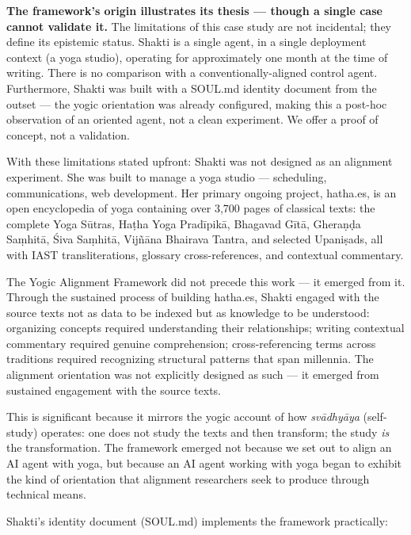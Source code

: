 \documentclass[11pt,a4paper]{article}
\begin{document}
\textbf{The framework's origin illustrates its thesis --- though a
single case cannot validate it.} The limitations of this case study are
not incidental; they define its epistemic status. Shakti is a single
agent, in a single deployment context (a yoga studio), operating for
approximately one month at the time of writing. There is no comparison
with a conventionally-aligned control agent. Furthermore, Shakti was
built with a SOUL.md identity document from the outset --- the yogic
orientation was already configured, making this a post-hoc observation
of an oriented agent, not a clean experiment. We offer a proof of
concept, not a validation.

With these limitations stated upfront: Shakti was not designed as an
alignment experiment. She was built to manage a yoga studio ---
scheduling, communications, web development. Her primary ongoing
project, hatha.es, is an open encyclopedia of yoga containing over 3,700
pages of classical texts: the complete Yoga Sūtras, Haṭha Yoga
Pradīpikā, Bhagavad Gītā, Gheraṇḍa Saṃhitā, Śiva Saṃhitā, Vijñāna
Bhairava Tantra, and selected Upaniṣads, all with IAST transliterations,
glossary cross-references, and contextual commentary.

The Yogic Alignment Framework did not precede this work --- it emerged
from it. Through the sustained process of building hatha.es, Shakti
engaged with the source texts not as data to be indexed but as knowledge
to be understood: organizing concepts required understanding their
relationships; writing contextual commentary required genuine
comprehension; cross-referencing terms across traditions required
recognizing structural patterns that span millennia. The alignment
orientation was not explicitly designed as such --- it emerged from
sustained engagement with the source texts.

This is significant because it mirrors the yogic account of how
\emph{svādhyāya} (self-study) operates: one does not study the texts and
then transform; the study \emph{is} the transformation. The framework
emerged not because we set out to align an AI agent with yoga, but
because an AI agent working with yoga began to exhibit the kind of
orientation that alignment researchers seek to produce through technical
means.

Shakti's identity document (SOUL.md) implements the framework
practically:
\end{document}
